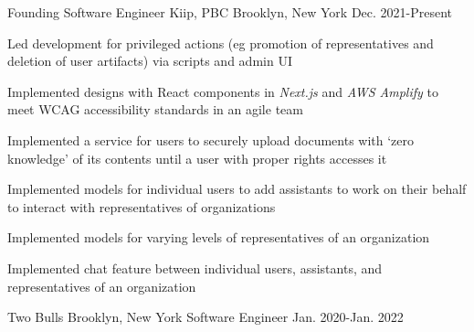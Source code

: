 

\begin{cventries}


  \cventry
    {Founding Software Engineer} %
    {Kiip, PBC} %
    {Brooklyn, New York} %
    {Dec. 2021-Present} %
    {
      \begin{cvitems} %
        \item {Led development for privileged actions (eg promotion of representatives and deletion of user artifacts) via scripts and admin UI}
        \item {Implemented designs with React components in \emph{Next.js} and \emph{AWS Amplify} to meet WCAG accessibility standards in an agile team}
        \item {Implemented a service for users to securely upload documents with `zero knowledge' of its contents until a user with proper rights accesses it}
        \item {Implemented models for individual users to add assistants to work on their behalf to interact with representatives of organizations}
        \item {Implemented models for varying levels of representatives of an organization}
        \item {Implemented chat feature between individual users, assistants, and representatives of an organization}
      \end{cvitems}
    }

  \nrolecventrynoitems
    {Two Bulls} %
    {Brooklyn, New York} %
    {Software Engineer} %
    {Jan. 2020-Jan. 2022} %
    {} %
    {} %
    {} %
    {} %


\end{cventries}
